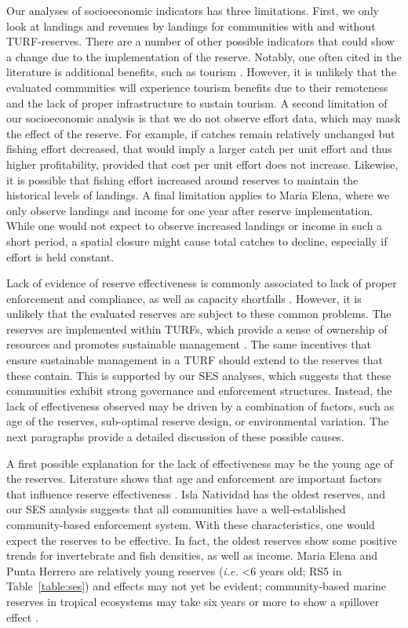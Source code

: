 \documentclass[10pt,letterpaper]{article}
\begin{document}
Our analyses of socioeconomic indicators has three limitations. First, we only look at landings and revenues by landings for communities with and without TURF-reserves. There are a number of other possible indicators that could show a change due to the implementation of the reserve. Notably, one often cited in the literature is additional benefits, such as tourism \cite{viana_2017}. However, it is unlikely that the evaluated communities will experience tourism benefits due to their remoteness and the lack of proper infrastructure to sustain tourism. A second limitation of our socioeconomic analysis is that we do not observe effort data, which may mask the effect of the reserve. For example, if catches remain relatively unchanged but fishing effort decreased, that would imply a larger catch per unit effort and thus higher profitability, provided that cost per unit effort does not increase. Likewise, it is possible that fishing effort increased around reserves to maintain the historical levels of landings. A final limitation applies to Maria Elena, where we only observe landings and income for one year after reserve implementation. While one would not expect to observe increased landings or income in such a short period, a spatial closure might cause total catches to decline, especially if effort is held constant.

Lack of evidence of reserve effectiveness is commonly associated to lack of proper enforcement and compliance, as well as capacity shortfalls \cite{edgar_2014-UO,difranco_2016-Xw,gill_2017}. However, it is unlikely that the evaluated reserves are subject to these common problems. The reserves are implemented within TURFs, which provide a sense of ownership of resources and promotes sustainable management \cite{mccay_2017}. The same incentives that ensure sustainable management in a TURF should extend to the reserves that these contain. This is supported by our SES analyses, which suggests that these communities exhibit strong governance and enforcement structures. Instead, the lack of effectiveness observed may be driven by a combination of factors, such as age of the reserves, sub-optimal reserve design, or environmental variation. The next paragraphs provide a detailed discussion of these possible causes.

A first possible explanation for the lack of effectiveness may be the young age of the reserves. Literature shows that age and enforcement are important factors that influence reserve effectiveness \cite{edgar_2014-UO,babcock_2010}. Isla Natividad has the oldest reserves, and our SES analysis suggests that all communities have a well-established community-based enforcement system. With these characteristics, one would expect the reserves to be effective. In fact, the oldest reserves show some positive trends for invertebrate and fish densities, as well as income. Maria Elena and Punta Herrero are relatively young reserves (\emph{i.e.} \textless 6 years old; RS5 in Table~\ref{table:ses}) and effects may not yet be evident; community-based marine reserves in tropical ecosystems may take six years or more to show a spillover effect \cite{dasilva_2015-zX}. 
\end{document}
